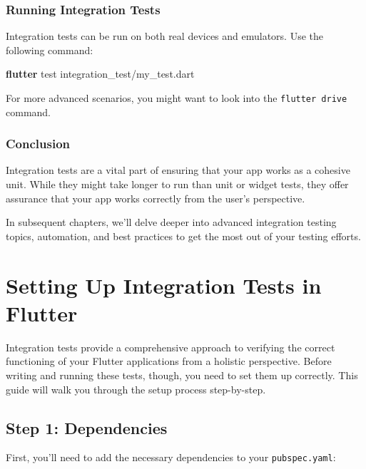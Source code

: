 \documentclass[
]{article}
\newenvironment{Shaded}{\begin{snugshade}}{\end{snugshade}}
\newcommand{\ExtensionTok}[1]{\textcolor[rgb]{0.00,0.60,1.00}{\textbf{#1}}}
\newcommand{\NormalTok}[1]{\textcolor[rgb]{0.81,0.81,0.76}{#1}}
\begin{document}
\subsubsection{Running Integration
Tests}\label{running-integration-tests}

Integration tests can be run on both real devices and emulators. Use the
following command:

\begin{Shaded}
\begin{Highlighting}[]
\ExtensionTok{flutter}\NormalTok{ test integration\_test/my\_test.dart}
\end{Highlighting}
\end{Shaded}

For more advanced scenarios, you might want to look into the
\texttt{flutter\ drive} command.

\subsubsection{Conclusion}\label{conclusion-8}

Integration tests are a vital part of ensuring that your app works as a
cohesive unit. While they might take longer to run than unit or widget
tests, they offer assurance that your app works correctly from the
user's perspective.

In subsequent chapters, we'll delve deeper into advanced integration
testing topics, automation, and best practices to get the most out of
your testing efforts.

\section{Setting Up Integration Tests in
Flutter}\label{setting-up-integration-tests-in-flutter}

Integration tests provide a comprehensive approach to verifying the
correct functioning of your Flutter applications from a holistic
perspective. Before writing and running these tests, though, you need to
set them up correctly. This guide will walk you through the setup
process step-by-step.

\subsection{Step 1: Dependencies}\label{step-1-dependencies}

First, you'll need to add the necessary dependencies to your
\texttt{pubspec.yaml}:
\end{document}

